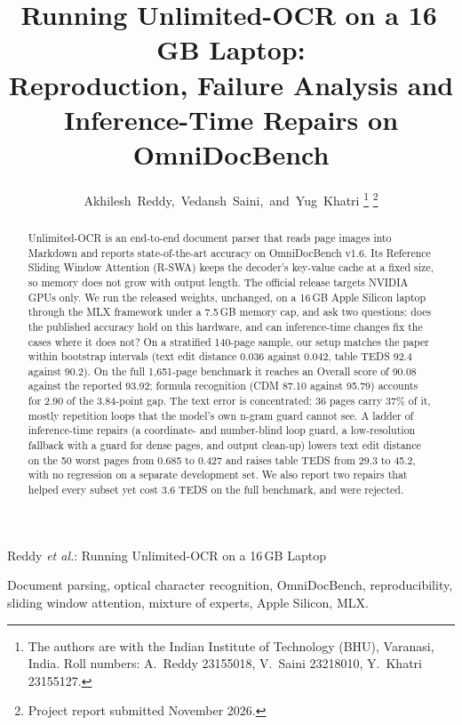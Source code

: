 \documentclass[journal]{IEEEtran}
\begin{document}
\title{Running Unlimited-OCR on a 16\,GB Laptop:\\ Reproduction, Failure Analysis and\\ Inference-Time Repairs on OmniDocBench}

\author{Akhilesh~Reddy,~Vedansh~Saini,~and~Yug~Khatri%
\thanks{The authors are with the Indian Institute of Technology (BHU),
Varanasi, India. Roll numbers: A.~Reddy 23155018, V.~Saini 23218010,
Y.~Khatri 23155127.}%
\thanks{Project report submitted November 2026.}}

%
{Reddy \MakeLowercase{\textit{et al.}}: Running Unlimited-OCR on a 16\,GB Laptop}

\maketitle

\begin{abstract}
Unlimited-OCR is an end-to-end document parser that reads page images into
Markdown and reports state-of-the-art accuracy on OmniDocBench v1.6. Its
Reference Sliding Window Attention (R-SWA) keeps the decoder's key-value cache at
a fixed size, so memory does not grow with output length. The official release
targets NVIDIA GPUs only. We run the released weights, unchanged, on a 16\,GB
Apple Silicon laptop through the MLX framework under a 7.5\,GB memory cap, and
ask two questions: does the published accuracy hold on this hardware, and can
inference-time changes fix the cases where it does not? On a stratified
140-page sample, our setup matches the paper within bootstrap intervals (text
edit distance 0.036 against 0.042, table TEDS 92.4 against 90.2). On the full
1,651-page benchmark it reaches an Overall score of 90.08 against the reported
93.92; formula recognition (CDM 87.10 against 95.79) accounts for 2.90 of the
3.84-point gap. The text error is concentrated: 36 pages carry 37\% of it,
mostly repetition loops that the model's own n-gram guard cannot see. A ladder
of inference-time repairs (a coordinate- and number-blind loop guard, a
low-resolution fallback with a guard for dense pages, and output clean-up)
lowers text edit distance on the 50 worst pages from 0.685 to 0.427 and raises
table TEDS from 29.3 to 45.2, with no regression on a separate development set.
We also report two repairs that helped every subset yet cost 3.6 TEDS on the
full benchmark, and were rejected.
\end{abstract}

\begin{IEEEkeywords}
Document parsing, optical character recognition, OmniDocBench, reproducibility,
sliding window attention, mixture of experts, Apple Silicon, MLX.
\end{IEEEkeywords}
\end{document}
